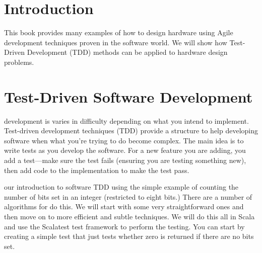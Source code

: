 \documentclass{tufte-book}
\begin{document}
\cleardoublepage
\chapter*{Introduction}

This book provides many examples of how to design hardware using Agile development techniques proven in the software world. We will show how Test-Driven Development (TDD) methods can be applied to hardware design problems.

\mainmatter


\chapter{Test-Driven Software Development}
\label{ch:tdsd}

 development is varies in difficulty depending on what you intend to implement. Test-driven development techniques (TDD) provide a structure to help developing software when what you're trying to do become complex. The main idea is to write tests as you develop the software. For a new feature you are adding, you add a test---make sure the test fails (ensuring you are testing something new), then add code to the implementation to make the test pass.

\vspace{-4\baselineskip}
\vspace{4\baselineskip}

 our introduction to software TDD using the simple example of counting the number of bits set in an integer (restricted to eight bits.)
There are a number of algorithms for do this. We will start with some very straightforward ones and then move on to more efficient and subtle techniques.
We will do this all in Scala and use the Scalatest test framework to perform the testing. You can start by creating a simple test that just tests whether zero is returned if there are no bits set.


\end{document}
